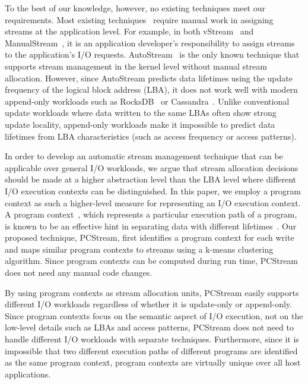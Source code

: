 To the best of our knowledge, however, no existing techniques meet our requirements.  
Most existing techniques~\cite{MultiStream, Level, FStream, vStream} require manual work 
in assigning streams at the application level.  For example,  
in both \textsf{\small vStream}~\cite{vStream} and
\textsf{\small ManualStream}~\cite{MultiStream}, it is an application developer's responsibility to assign streams 
to the application's I/O requests.  
\textsf{\small AutoStream}~\cite{AutoStream} is the only known technique
that supports stream management in the kernel level without manual stream allocation.
However, since \textsf{\small AutoStream} predicts data lifetimes using the update frequency 
of the logical block address (LBA), it does not work well with modern append-only workloads 
such as RocksDB~\cite{RocksDB} or Cassandra~\cite{Cassandra}.  
Unlike conventional update workloads where data written to the same LBAs 
often show strong update locality, 
append-only workloads make it impossible to predict data lifetimes 
from LBA characteristics (such as access frequency or access patterns).  

In order to develop an automatic stream management technique that can be applicable 
over general I/O workloads, we argue that stream allocation decisions should be made 
at a higher abstraction level
than the LBA level where different I/O execution 
contexts can be distinguished.  
In this paper, we employ a program context as such a higher-level measure for 
representing an I/O execution context.
A program context~\cite{PC, PC2}, which represents a particular execution path of a program, 
is known to be an effective hint in separating data with different lifetimes~\cite{PCHa}.  
Our proposed technique, \textsf{\small PCStream}, first identifies a program context 
for each write and maps similar program contexts to streams 
using a k-means clustering algorithm.
Since program contexts can be computed during run time, 
\textsf{\small PCStream} does not need any manual code changes.   

By using program contexts as stream allocation units, \textsf{\small PCStream} easily 
supports different I/O workloads regardless of whether it is update-only or append-only.   
Since program contexts focus on the
semantic aspect of I/O execution, not on the low-level details such as 
LBAs and access patterns, \textsf{\small PCStream} does not need to handle different I/O workloads 
with separate techniques.  Furthermore, since
it is impossible that two different execution paths of different programs are identified 
as the same program context, program contexts are virtually unique over all host applications. 

